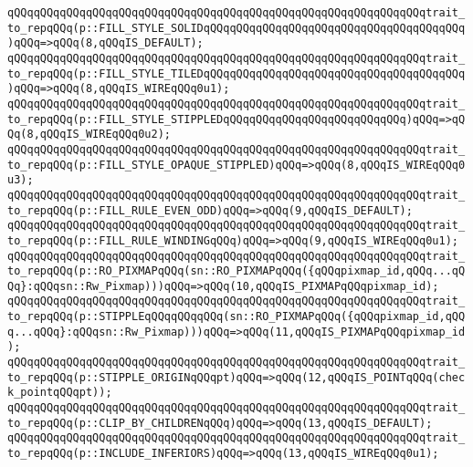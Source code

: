 \newline
\verb|qQQqqQQqqQQqqQQqqQQqqQQqqQQqqQQqqQQqqQQqqQQqqQQqqQQqqQQqqQQqqQQqtrait_to_repqQQq(p::FILL_STYLE_SOLIDqQQqqQQqqQQqqQQqqQQqqQQqqQQqqQQqqQQqqQQq)qQQq=>qQQq(8,qQQqIS_DEFAULT);|\newline
\verb|qQQqqQQqqQQqqQQqqQQqqQQqqQQqqQQqqQQqqQQqqQQqqQQqqQQqqQQqqQQqqQQqtrait_to_repqQQq(p::FILL_STYLE_TILEDqQQqqQQqqQQqqQQqqQQqqQQqqQQqqQQqqQQqqQQq)qQQq=>qQQq(8,qQQqIS_WIREqQQq0u1);|\newline
\verb|qQQqqQQqqQQqqQQqqQQqqQQqqQQqqQQqqQQqqQQqqQQqqQQqqQQqqQQqqQQqqQQqtrait_to_repqQQq(p::FILL_STYLE_STIPPLEDqQQqqQQqqQQqqQQqqQQqqQQqqQQq)qQQq=>qQQq(8,qQQqIS_WIREqQQq0u2);|\newline
\verb|qQQqqQQqqQQqqQQqqQQqqQQqqQQqqQQqqQQqqQQqqQQqqQQqqQQqqQQqqQQqqQQqtrait_to_repqQQq(p::FILL_STYLE_OPAQUE_STIPPLED)qQQq=>qQQq(8,qQQqIS_WIREqQQq0u3);|\newline
\newline
\verb|qQQqqQQqqQQqqQQqqQQqqQQqqQQqqQQqqQQqqQQqqQQqqQQqqQQqqQQqqQQqqQQqtrait_to_repqQQq(p::FILL_RULE_EVEN_ODD)qQQq=>qQQq(9,qQQqIS_DEFAULT);|\newline
\verb|qQQqqQQqqQQqqQQqqQQqqQQqqQQqqQQqqQQqqQQqqQQqqQQqqQQqqQQqqQQqqQQqtrait_to_repqQQq(p::FILL_RULE_WINDINGqQQq)qQQq=>qQQq(9,qQQqIS_WIREqQQq0u1);|\newline
\newline
\verb|qQQqqQQqqQQqqQQqqQQqqQQqqQQqqQQqqQQqqQQqqQQqqQQqqQQqqQQqqQQqqQQqtrait_to_repqQQq(p::RO_PIXMAPqQQq(sn::RO_PIXMAPqQQq({qQQqpixmap_id,qQQq...qQQq}:qQQqsn::Rw_Pixmap)))qQQq=>qQQq(10,qQQqIS_PIXMAPqQQqpixmap_id);|\newline
\verb|qQQqqQQqqQQqqQQqqQQqqQQqqQQqqQQqqQQqqQQqqQQqqQQqqQQqqQQqqQQqqQQqtrait_to_repqQQq(p::STIPPLEqQQqqQQqqQQq(sn::RO_PIXMAPqQQq({qQQqpixmap_id,qQQq...qQQq}:qQQqsn::Rw_Pixmap)))qQQq=>qQQq(11,qQQqIS_PIXMAPqQQqpixmap_id);|\newline
\newline
\verb|qQQqqQQqqQQqqQQqqQQqqQQqqQQqqQQqqQQqqQQqqQQqqQQqqQQqqQQqqQQqqQQqtrait_to_repqQQq(p::STIPPLE_ORIGINqQQqpt)qQQq=>qQQq(12,qQQqIS_POINTqQQq(check_pointqQQqpt));|\newline
\newline
\verb|qQQqqQQqqQQqqQQqqQQqqQQqqQQqqQQqqQQqqQQqqQQqqQQqqQQqqQQqqQQqqQQqtrait_to_repqQQq(p::CLIP_BY_CHILDRENqQQq)qQQq=>qQQq(13,qQQqIS_DEFAULT);|\newline
\verb|qQQqqQQqqQQqqQQqqQQqqQQqqQQqqQQqqQQqqQQqqQQqqQQqqQQqqQQqqQQqqQQqtrait_to_repqQQq(p::INCLUDE_INFERIORS)qQQq=>qQQq(13,qQQqIS_WIREqQQq0u1);|\newline
